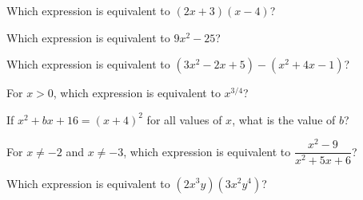 \renewcommand{\nocalc}{}
\newcommand{\gr}[2]{\begin{center}\begin{tikzpicture}\begin{axis}[gridaxis,#1]#2\end{axis}\end{tikzpicture}\end{center}}
\newcommand{\pt}[1]{\node[circle,fill=apblue,inner sep=1.5pt] at (axis cs:#1){};}

\begin{exo}{}
Which expression is equivalent to $(2x+3)(x-4)$?
\end{exo}
\begin{exo}{}
Which expression is equivalent to $9x^2-25$?
\end{exo}
\begin{exo}{}
Which expression is equivalent to $(3x^2-2x+5)-(x^2+4x-1)$?
\end{exo}
\begin{exo}{}
For $x>0$, which expression is equivalent to $x^{3/4}$?
\end{exo}
\begin{exo}{\sprtag}
If $x^2+bx+16=(x+4)^2$ for all values of $x$, what is the value of $b$?
\end{exo}
\begin{exo}{}
For $x\neq-2$ and $x\neq-3$, which expression is equivalent to $\dfrac{x^2-9}{x^2+5x+6}$?
\end{exo}
\begin{exo}{}
Which expression is equivalent to $(2x^3y)(3x^2y^4)$?
\end{exo}
